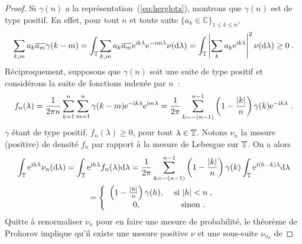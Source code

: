\begin{proof}
 Si $\gamma(n)$ a la
repr\'esentation~(\ref{eq:herglotz}), montrons que $\gamma(n)$
est de type positif. En effet, pour tout $n$ et toute suite
$\{a_k\in\mathbb{C}\}_{1\leq k\leq n}$,
$$
 \sum_{k,m} a_k\overline{a_m} \gamma(k-m)=
 \int_{\mathbb{T}} \sum_{k,m} a_k\overline{a_m} \mathrm{e}^{\mathrm{i} k \lambda}\mathrm{e}^{-im \lambda} \nu(\mathrm{d}\lambda)=
 \int_{\mathbb{T}}\left| \sum_{k} a_k \mathrm{e}^{\mathrm{i} k \lambda}\right|^2 \nu(\mathrm{d}\lambda)\geq 0\;.
 $$
 R\'eciproquement, supposons que $\gamma(n)$ soit une suite de type
 positif et consid\'erons la suite de fonctions index\'ee par $n$~:
\[
 f_n(\lambda)
 = \frac{1}{2\pi n} \sum_{k=1}^n \sum_{m=1}^n \gamma(k-m) \mathrm{e}^{-\mathrm{i} k \lambda} \mathrm{e}^{\mathrm{i} m\lambda}
 = \frac{1}{2\pi}\sum_{k=-(n-1)}^{n-1} \left( 1 - \frac{|k|}{n} \right)
                    \gamma(k) \mathrm{e}^{-\mathrm{i} k \lambda}\; .
\]
$\gamma$ \'etant de type positif, $f_n(\lambda)\geq 0$, pour tout $\lambda\in \mathbb{T}.$
Notons
$\nu_n$ la mesure (positive) de densit\'e $f_n$ par rapport \`a la mesure de
Lebesgue sur $\mathbb{T}$. On a alors
\begin{multline}\label{eq:herglotz_1}
\int_{\mathbb{T}}\mathrm{e}^{\mathrm{i} h \lambda}\nu_n(\mathrm{d}\lambda)
=\int_{\mathbb{T}}\mathrm{e}^{\mathrm{i} h \lambda}f_n(\lambda)\mathrm{d}\lambda
=\frac{1}{2\pi}\sum_{k=-(n-1)}^{n-1} \left( 1 - \frac{|k|}{n} \right)
                    \gamma(k) \int_{\mathbb{T}}\mathrm{e}^{\mathrm{i} (h-k)
                      \lambda}\mathrm{d}\lambda\\
=
\left\lbrace
\begin{array}{cc}
\left(1-\frac{|h|}{n}\right)\gamma(h),&\textrm{ si }|h|<n\; ,\\
0,&\textrm{ sinon}\; .
\end{array}
\right.
\end{multline}
Quitte \`a renormaliser $\nu_n$ pour en faire une mesure de probabilit\'e,
le th\'eor\`eme de Prohorov implique qu'il existe une mesure positive $\nu$ et une sous-suite $\nu_{n_k}$ de

\end{proof}
